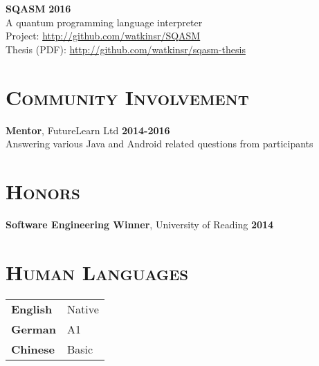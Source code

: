 \documentclass[line, margin, 10pt]{res}
\begin{document}
\begin{resume}
{\bf SQASM} {\bf \hfill 2016}\\
A quantum programming language interpreter\\
Project: \url{http://github.com/watkinsr/SQASM}\\
Thesis (PDF): \url{http://github.com/watkinsr/sqasm-thesis}\\


\section{\textsc{Community Involvement}}

{\bf Mentor}, FutureLearn Ltd {\bf \hfill 2014-2016}\\
Answering various Java and Android related questions from participants

\section{\textsc{Honors}}

{\bf Software Engineering Winner}, University of Reading {\bf \hfill 2014}\\

\section{\textsc{Human Languages}}

\begin{tabular}[t]{@{} p{1.2in} p{3.75in} @{}}

\textbf{English} & Native\\ 
\textbf{German} & A1 \\
\textbf{Chinese} & Basic

\end{tabular}

\end{resume}
\end{document}
